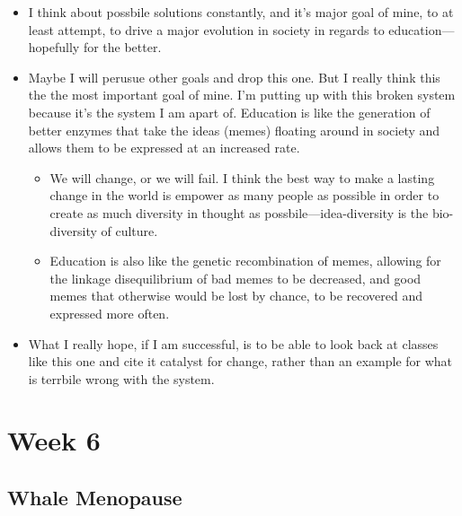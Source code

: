 \documentclass[12pt,a4paper]{article}
\begin{document}
    \begin{itemize}
        \item I think about possbile solutions constantly, and it's major goal of mine, to at least attempt, to drive a major evolution in society in regards to education---hopefully for the better.
        \item Maybe I will perusue other goals and drop this one. But I really think this the the most important goal of mine. I'm putting up with this broken system because it's the system I am apart of. Education is like the generation of better enzymes that take the ideas (memes) floating around in society and allows them to be expressed at an increased rate. 
            \begin{itemize}
                \item We will change, or we will fail. I think the best way to make a lasting change in the world is empower as many people as possible in order to create as much diversity in thought as possbile---idea-diversity is the bio-diversity of culture.
                \item Education is also like the genetic recombination of memes, allowing for the linkage disequilibrium of bad memes to be decreased, and good memes that otherwise would be lost by chance, to be recovered and expressed more often.
            \end{itemize}
        \item What I really hope, if I am successful, is to be able to look back at classes like this one and cite it catalyst for change, rather than an example for what is terrbile wrong with the system.
    \end{itemize}

\clearpage
\section*{Week 6}
{}

\subsection{Whale Menopause}
\end{document}
